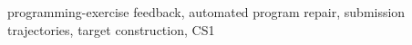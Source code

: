 \documentclass[10pt,conference]{IEEEtran}
\begin{document}
\begin{abstract}
\end{abstract}
\begin{IEEEkeywords}
programming-exercise feedback, automated program repair, submission trajectories, target construction, CS1
\end{IEEEkeywords}
\end{document}
